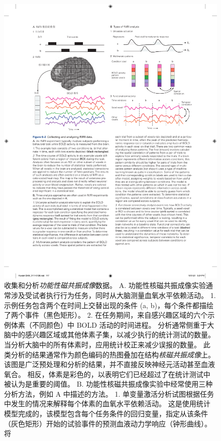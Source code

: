 \begin{figure}[htbp]
	\centering
	\includegraphics[width=1.0\linewidth]{chap06/fig_6_2}
	\caption{收集和分析\textit{功能性磁共振成像}数据。 
		A. 功能性核磁共振成像实验通常涉及受试者执行行为任务，同时从大脑测量血氧水平依赖活动。 
		1. 示例任务包含两个在时间上交替出现的条件 (a, b)，每个条件都描绘了两个事件（黑色矩形）。 
		2. 在任务期间，来自感兴趣区域的六个示例体素（不同颜色）中 BOLD 活动的时间进程。 
		分析通常侧重于大脑中的感兴趣区域或其他体素子集，以减少执行的统计测试的数量。 
		当分析大脑中的所有体素时，应用统计校正来减少误报的数量。 
		此类分析的结果通常作为颜色编码的热图叠加在结构\textit{核磁共振成像}上。 
		该图是广泛预处理和分析的结果，并不直接反映神经元活动甚至血液氧合。 
		相反，体素是彩色的，以表明它们已经超过了在统计测试中被认为是重要的阈值。 
		B. 功能性核磁共振成像实验中经常使用三种分析方法，例如 A 中描述的方法。
		1. 单变量激活分析试图根据任务中发生的情况来解释每个体素的血氧水平依赖活动。 
		这是使用统计模型完成的，该模型包含每个任务条件的回归变量，指定从该条件（灰色矩形）开始的试验事件的预测血液动力学响应（钟形曲线）。 将
}
\end{figure}
